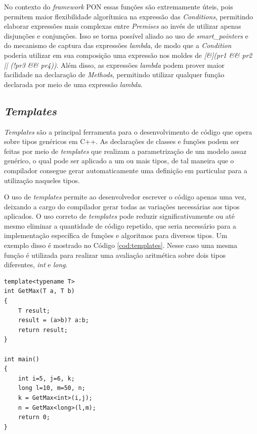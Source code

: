 No contexto do \textit{framework} PON essas funções são extremamente úteis, pois
permitem maior flexibilidade algorítmica na expressão das \textit{Conditions},
permitindo elaborar expressões mais complexas entre \textit{Premises} ao invés
de utilizar apenas disjunções e conjunções. Isso se torna possível aliado ao uso
de \textit{smart\_pointers} e do mecanismo de captura das expressões
\textit{lambda}, de modo que a \textit{Condition} poderia utilizar em sua
composição uma expressão nos moldes de \textit{[\&](pr1 \&\& pr2 || (!pr3 \&\&
pr4))}. Além disso, as expressões \textit{lambda} podem prover maior facilidade
na declaração de \textit{Methods}, permitindo utilizar qualquer função declarada
por meio de uma expressão \textit{lambda}.

\subsection{\textit{Templates}}

\textit{Templates} são a principal ferramenta para o desenvolvimento de código
que opera sobre tipos genéricos em C++. As declarações de classes e funções
podem ser feitas por meio de \textit{templates} que realizam a parametrização de
um modelo assaz genérico, o qual pode ser aplicado a um ou mais tipos, de tal
maneira que o compilador consegue gerar automaticamente	uma definição em
particular para a utilização naqueles tipos.

O uso de \textit{templates} permite ao desenvolvedor escrever o código apenas
uma vez, deixando a cargo do compilador gerar todas as variações necessárias aos
tipos aplicados. O uso correto de \textit{templates} pode reduzir
significativamente ou até mesmo eliminar a quantidade de código repetido, que
seria necessário para a implementação específica de funções e algoritmos para
diversos tipos. Um exemplo disso é mostrado no Código \ref{cod:templates}. Nesse
caso uma mesma função é utilizada para realizar uma avaliação aritmética sobre
dois tipos diferentes, \textit{int} e \textit{long}.

\begin{lstlisting}[caption = {Uso de \textit{templates}}, float=htb,
source = {Autoria própria},
label = {cod:templates}]
template<typename T>
int GetMax(T a, T b)
{
    T result;
    result = (a>b)? a:b;
    return result;
}

int main()
{
    int i=5, j=6, k;
    long l=10, m=50, n;
    k = GetMax<int>(i,j);
    n = GetMax<long>(l,m);
    return 0;
}
\end{lstlisting}

